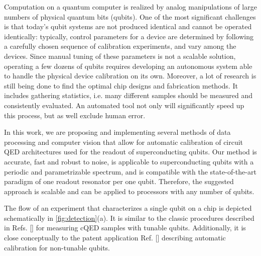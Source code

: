 \documentclass[%
 aip,
 amsmath,amssymb,
 reprint,%
]{revtex4-1}
\begin{document}
Computation on a quantum computer is realized by analog manipulations of large numbers of physical quantum bits (qubits). One of the most significant challenges is that today’s qubit systems are not produced identical and cannot be operated identically\cite{kelly2018, chen2018}: typically, control parameters for a device are determined by following a carefully chosen sequence of calibration experiments, and vary among the devices. Since manual tuning of these parameters is not a scalable solution, operating a few dozens of qubits requires developing an autonomous system able to handle the physical device calibration on its own. Moreover, a lot of research is still being done to find the optimal chip designs and fabrication methods. It includes gathering statistics, i.e. many different samples should be measured and consistently evaluated. An automated tool not only will significantly speed up this process, but as well exclude human error.

In this work, we are proposing and implementing several methods of data processing and computer vision that allow for automatic calibration of circuit QED\cite{blais2007} architectures used for the readout of superconducting qubits. Our method is accurate, fast and robust to noise, is applicable to superconducting qubits with a periodic and parametrizable spectrum, and is compatible with the state-of-the-art paradigm of one readout resonator per one qubit\cite{versluis2017, kelly2015}. Therefore, the suggested approach is scalable and can be applied to processors with any number of qubits.

The flow of an experiment that characterizes a single qubit on a chip is depicted schematically in \autoref{fig:detection}(a). It is similar to the classic procedures described in Refs. [] for measuring cQED samples with tunable qubits. Additionally, it is close conceptually to the patent application Ref. [] describing automatic calibration for non-tunable qubits.
\end{document}
